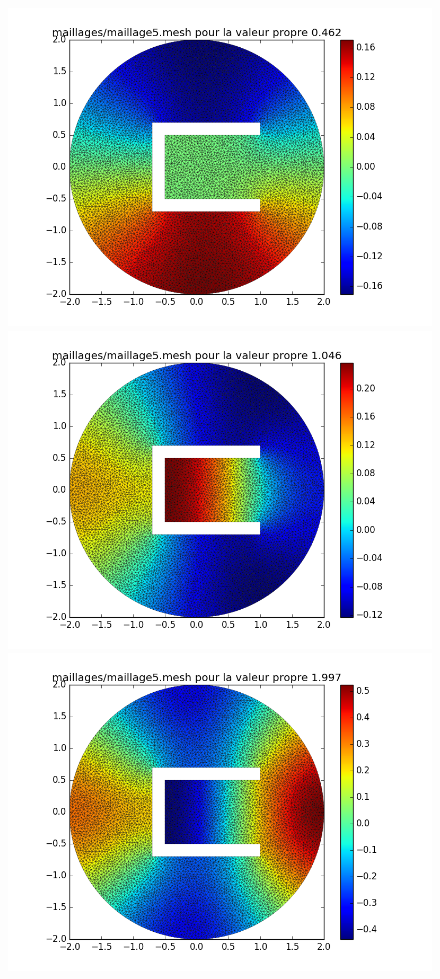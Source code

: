 \documentclass[a4paper,12pt]{article}
\begin{document}
\begin{figure}[H]
\begin{center}
        \includegraphics[scale = 0.3]{image/II/trace_3}
        \includegraphics[scale = 0.3]{image/II/trace_4}
        \includegraphics[scale = 0.3]{image/II/trace_5}

\end{center}
\end{figure}
\end{document}
